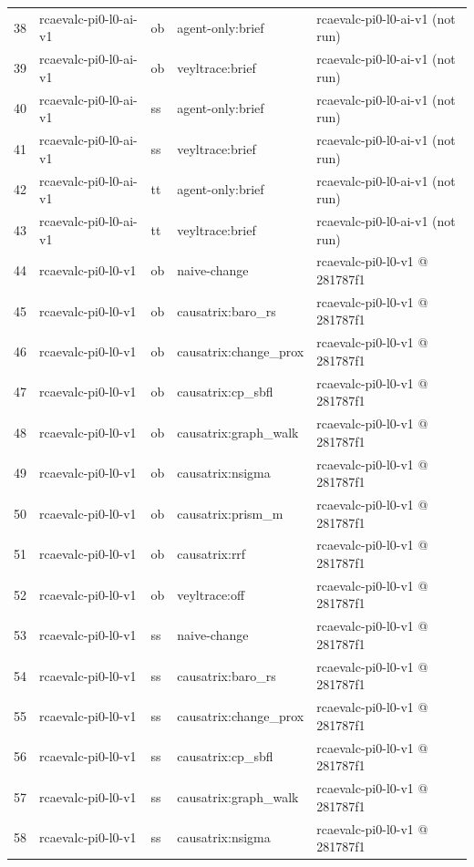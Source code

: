 \begin{longtable}{@{}r>{\raggedright\arraybackslash}p{87.0pt}>{\raggedright\arraybackslash}p{18.0pt}>{\raggedright\arraybackslash}p{63.0pt}>{\raggedright\arraybackslash}p{108.0pt}@{}}
38 & rcaevalc-pi0-l0-ai-v1 & ob & agent-only:brief & rcaevalc-pi0-l0-ai-v1 (not run) \\
39 & rcaevalc-pi0-l0-ai-v1 & ob & veyltrace:brief & rcaevalc-pi0-l0-ai-v1 (not run) \\
40 & rcaevalc-pi0-l0-ai-v1 & ss & agent-only:brief & rcaevalc-pi0-l0-ai-v1 (not run) \\
41 & rcaevalc-pi0-l0-ai-v1 & ss & veyltrace:brief & rcaevalc-pi0-l0-ai-v1 (not run) \\
42 & rcaevalc-pi0-l0-ai-v1 & tt & agent-only:brief & rcaevalc-pi0-l0-ai-v1 (not run) \\
43 & rcaevalc-pi0-l0-ai-v1 & tt & veyltrace:brief & rcaevalc-pi0-l0-ai-v1 (not run) \\
44 & rcaevalc-pi0-l0-v1 & ob & naive-change & rcaevalc-pi0-l0-v1 @ 281787f1 \\
45 & rcaevalc-pi0-l0-v1 & ob & causatrix:baro\_rs & rcaevalc-pi0-l0-v1 @ 281787f1 \\
46 & rcaevalc-pi0-l0-v1 & ob & causatrix:change\_prox & rcaevalc-pi0-l0-v1 @ 281787f1 \\
47 & rcaevalc-pi0-l0-v1 & ob & causatrix:cp\_sbfl & rcaevalc-pi0-l0-v1 @ 281787f1 \\
48 & rcaevalc-pi0-l0-v1 & ob & causatrix:graph\_walk & rcaevalc-pi0-l0-v1 @ 281787f1 \\
49 & rcaevalc-pi0-l0-v1 & ob & causatrix:nsigma & rcaevalc-pi0-l0-v1 @ 281787f1 \\
50 & rcaevalc-pi0-l0-v1 & ob & causatrix:prism\_m & rcaevalc-pi0-l0-v1 @ 281787f1 \\
51 & rcaevalc-pi0-l0-v1 & ob & causatrix:rrf & rcaevalc-pi0-l0-v1 @ 281787f1 \\
52 & rcaevalc-pi0-l0-v1 & ob & veyltrace:off & rcaevalc-pi0-l0-v1 @ 281787f1 \\
53 & rcaevalc-pi0-l0-v1 & ss & naive-change & rcaevalc-pi0-l0-v1 @ 281787f1 \\
54 & rcaevalc-pi0-l0-v1 & ss & causatrix:baro\_rs & rcaevalc-pi0-l0-v1 @ 281787f1 \\
55 & rcaevalc-pi0-l0-v1 & ss & causatrix:change\_prox & rcaevalc-pi0-l0-v1 @ 281787f1 \\
56 & rcaevalc-pi0-l0-v1 & ss & causatrix:cp\_sbfl & rcaevalc-pi0-l0-v1 @ 281787f1 \\
57 & rcaevalc-pi0-l0-v1 & ss & causatrix:graph\_walk & rcaevalc-pi0-l0-v1 @ 281787f1 \\
58 & rcaevalc-pi0-l0-v1 & ss & causatrix:nsigma & rcaevalc-pi0-l0-v1 @ 281787f1 \\

\end{longtable}
